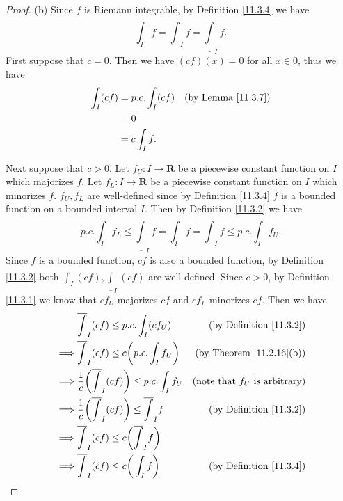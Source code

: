 \begin{proof}{(b)}
    Since \(f\) is Riemann integrable, by Definition \ref{11.3.4} we have
    \[
        \int_I f = \overline{\int}_I f = \underline{\int}_I f.
    \]
    First suppose that \(c = 0\).
    Then we have \((cf)(x) = 0\) for all \(x \in 0\), thus we have
    \begin{align*}
        \int_I (cf) & = p.c. \int_I (cf) & \text{(by Lemma \ref{11.3.7})} \\
                    & = 0                                                 \\
                    & = c \int_I f.
    \end{align*}

    Next suppose that \(c > 0\).
    Let \(f_U : I \to \mathbf{R}\) be a piecewise constant function on \(I\) which majorizes \(f\).
    Let \(f_L : I \to \mathbf{R}\) be a piecewise constant function on \(I\) which minorizes \(f\).
    \(f_U, f_L\) are well-defined since by Definition \ref{11.3.4} \(f\) is a bounded function on a bounded interval \(I\).
    Then by Definition \ref{11.3.2} we have
    \[
        p.c. \int_I f_L \leq \underline{\int}_I f = \int_I f = \overline{\int}_I f \leq p.c. \int_I f_U.
    \]
    Since \(f\) is a bounded function, \(cf\) is also a bounded function, by Definition \ref{11.3.2} both \(\overline{\int}_I (cf), \underline{\int}_I (cf)\) are well-defined.
    Since \(c > 0\), by Definition \ref{11.3.1} we know that \(c f_U\) majorizes \(c f\) and \(c f_L\) minorizes \(c f\).
    Then we have
    \begin{align*}
                 & \overline{\int}_I (cf) \leq p.c. \int_I (c f_U)                         & \text{(by Definition \ref{11.3.2})}     \\
        \implies & \overline{\int}_I (cf) \leq c \bigg(p.c. \int_I f_U\bigg)               & \text{(by Theorem \ref{11.2.16}(b))}    \\
        \implies & \frac{1}{c} \bigg(\overline{\int}_I (cf)\bigg) \leq p.c. \int_I f_U     & \text{(note that \(f_U\) is arbitrary)} \\
        \implies & \frac{1}{c} \bigg(\overline{\int}_I (cf)\bigg) \leq \overline{\int}_I f & \text{(by Definition \ref{11.3.2})}     \\
        \implies & \overline{\int}_I (cf) \leq c\bigg(\overline{\int}_I f\bigg)                                                      \\
        \implies & \overline{\int}_I (cf) \leq c\bigg(\int_I f\bigg)                       & \text{(by Definition \ref{11.3.4})}

\end{align*}
\end{proof}
